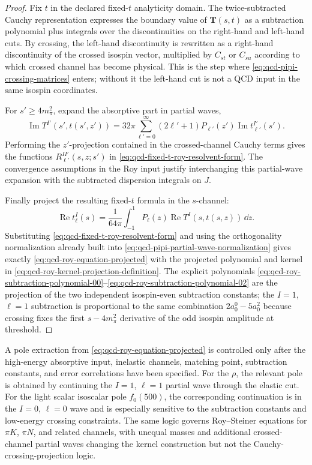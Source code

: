 \begin{proof}
Fix \(t\) in the declared fixed-\(t\) analyticity domain.  The twice-subtracted
Cauchy representation expresses the boundary value of \(\mathbf T(s,t)\) as a
subtraction polynomial plus integrals over the discontinuities on the
right-hand and left-hand cuts.  By crossing, the left-hand discontinuity is
rewritten as a right-hand discontinuity of the crossed isospin vector,
multiplied by \(C_{st}\) or \(C_{su}\) according to which crossed channel has
become physical.  This is the step where
\eqref{eq:qcd-pipi-crossing-matrices} enters; without it the left-hand cut is
not a QCD input in the same isospin coordinates.

For \(s'\ge4m_\pi^2\), expand the absorptive part in partial waves,
\[
  \operatorname{Im}T^{I'}(s',t(s',z'))
  =
  32\pi
  \sum_{\ell'=0}^\infty
  (2\ell'+1)P_{\ell'}(z')\operatorname{Im}t_{\ell'}^{I'}(s').
  \]
Performing the \(z'\)-projection contained in the crossed-channel Cauchy
terms gives the functions \(R_{\ell'}^{II'}(s,z;s')\) in
\eqref{eq:qcd-fixed-t-roy-resolvent-form}.  The convergence assumptions in
the Roy input justify interchanging this partial-wave expansion with the
subtracted dispersion integrals on \(J\).

Finally project the resulting fixed-\(t\) formula in the \(s\)-channel:
\[
  \operatorname{Re}t_\ell^I(s)
  =
  \frac1{64\pi}\int_{-1}^{1}P_\ell(z)
  \operatorname{Re}T^I(s,t(s,z))\,\dd z .
  \]
Substituting \eqref{eq:qcd-fixed-t-roy-resolvent-form} and using the
orthogonality normalization already built into
\eqref{eq:qcd-pipi-partial-wave-normalization} gives exactly
\eqref{eq:qcd-roy-equation-projected} with the projected polynomial and
kernel in \eqref{eq:qcd-roy-kernel-projection-definition}.  The explicit
polynomials \eqref{eq:qcd-roy-subtraction-polynomial-00}--\eqref{eq:qcd-roy-subtraction-polynomial-02}
are the projection of the two independent isospin-even subtraction constants;
the \(I=1\), \(\ell=1\) subtraction is proportional to the same combination
\(2a_0^0-5a_0^2\) because crossing fixes the first \(s-4m_\pi^2\) derivative
of the odd isospin amplitude at threshold.
\end{proof}

\begin{remark}
A pole extraction from \eqref{eq:qcd-roy-equation-projected} is controlled
only after the high-energy absorptive input, inelastic channels, matching
point, subtraction constants, and error correlations have been specified.
For the \(\rho\), the relevant pole is obtained by continuing the \(I=1\),
\(\ell=1\) partial wave through the elastic cut.  For the light scalar
isoscalar pole \(f_0(500)\), the corresponding continuation is in the
\(I=0\), \(\ell=0\) wave and is especially sensitive to the subtraction
constants and low-energy crossing constraints.  The same logic governs
Roy--Steiner equations for \(\pi K\), \(\pi N\), and related channels, with
unequal masses and additional crossed-channel partial waves changing the
kernel construction but not the Cauchy-crossing-projection logic.
\end{remark}

